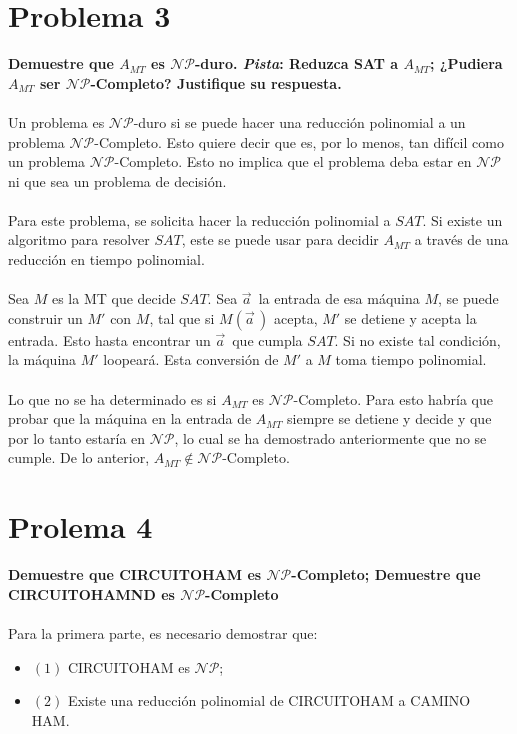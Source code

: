 \documentclass{article}
\def\NP{\mathcal{NP}}
\begin{document}
\section{Problema 3}
\textbf{Demuestre que $A_{MT}$ es $\NP$-duro. \textit{Pista}: Reduzca SAT a $A_{MT}$; ¿Pudiera $A_{MT}$ ser $\NP$-Completo? Justifique su respuesta.}
\\\\
Un problema es $\NP$-duro si se puede hacer una reducción polinomial a un problema $\NP$-Completo. Esto quiere decir que es, por lo menos, tan difícil como un problema $\NP$-Completo. Esto no implica que el problema deba estar en $\NP$ ni que sea un problema de decisión.
\\\\
Para este problema, se solicita hacer la reducción polinomial a $SAT$. Si existe un algoritmo para resolver $SAT$, este se puede usar para decidir $A_{MT}$ a través de una reducción en tiempo polinomial.
\\\\
Sea $M$ es la MT que decide $SAT$. Sea $\vec{a}^{\,}$ la entrada de esa máquina $M$, se puede construir un $M'$ con $M$, tal que si $M(\vec{a}^{\,})$ acepta, $M'$ se detiene y acepta la entrada. Esto hasta encontrar un $\vec{a}^{\,}$ que cumpla $SAT$. Si no existe tal condición, la máquina $M'$ loopeará. Esta conversión de $M'$ a $M$ toma tiempo polinomial.
\\\\
Lo que no se ha determinado es si $A_{MT}$ es $\NP$-Completo. Para esto habría que probar que la máquina en la entrada de $A_{MT}$ siempre se detiene y decide y que por lo tanto estaría en $\NP$, lo cual se ha demostrado anteriormente que no se cumple. De lo anterior, $A_{MT} \notin \NP$-Completo.

\section{Prolema 4}
\textbf{Demuestre que CIRCUITOHAM es $\NP$-Completo; Demuestre que CIRCUITOHAMND es $\NP$-Completo}
\\\\
Para la primera parte, es necesario demostrar que:
\begin{itemize}
	\item $(1)$ CIRCUITOHAM es $\NP$;
	\item $(2)$ Existe una reducción polinomial de CIRCUITOHAM a CAMINO HAM.
\end{itemize}
\end{document}
